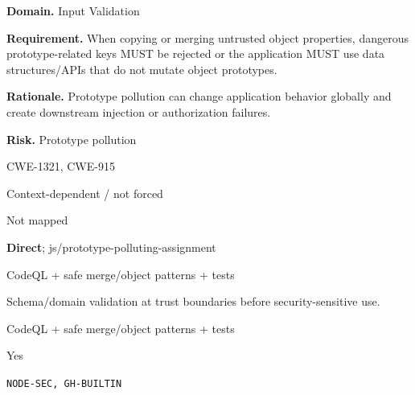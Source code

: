 \documentclass[10pt,letterpaper]{article}
\newcommand{\prioritybadge}[2]{\tcbox[on line,boxrule=0pt,arc=1.2mm,boxsep=0.7mm,left=1mm,right=1mm,top=0.4mm,bottom=0.4mm,colback=#2!12,coltext=#2]{\scriptsize\bfseries #1}}
\begin{document}
\begin{rulebox}[title={\texttt{SCS-JS-INPUT-001} \hfill \prioritybadge{High Priority}{High}}]
\textbf{Domain.} Input Validation

\textbf{Requirement.} When copying or merging untrusted object properties, dangerous prototype-related keys MUST be rejected or the application MUST use data structures/APIs that do not mutate object prototypes.

\textbf{Rationale.} Prototype pollution can change application behavior globally and create downstream injection or authorization failures.

\textbf{Risk.} Prototype pollution

\begin{description}[leftmargin=2.65cm,labelwidth=2.3cm,style=nextline,itemsep=1pt,topsep=3pt]
  \item[CWE] CWE-1321, CWE-915
  \item[OWASP] Context-dependent / not forced
  \item[CERT] Not mapped
  \item[CodeQL] \textbf{Direct}; js/prototype-polluting-assignment
  \item[Enforcement] CodeQL + safe merge/object patterns + tests
  \item[Prevention] Schema/domain validation at trust boundaries before security-sensitive use.
  \item[Verification] CodeQL + safe merge/object patterns + tests
  \item[Automation] Yes
  \item[Sources] \texttt{NODE-SEC, GH-BUILTIN}
\end{description}
\end{rulebox}
\end{document}
